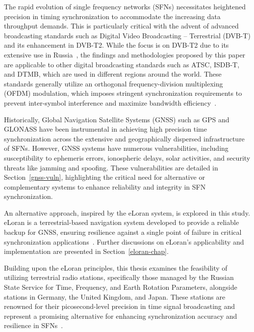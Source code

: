 \documentclass[12pt, a4paper]{extarticle}
\begin{document}

The rapid evolution of single frequency networks (SFNs) necessitates heightened
precision in timing synchronization to accommodate the increasing data
throughput demands. This is particularly critical with the advent of advanced
broadcasting standards such as Digital Video Broadcasting -- Terrestrial
(DVB-T) and its enhancement in DVB-T2. While the focus is on DVB-T2 due to its
extensive use in Russia~\cite{fcp}, the findings and methodologies proposed by
this paper are applicable to other digital broadcasting standards such as ATSC,
ISDB-T, and DTMB, which are used in different regions around the world. These
standards generally utilize an orthogonal frequency-division multiplexing (OFDM)
modulation, which imposes stringent synchronization requirements to prevent
inter-symbol interference and maximize bandwidth
efficiency~\cite{ETSIDVBT22009,liang2007timing,morshed2009synchronization,ofdm}.

Historically, Global Navigation Satellite Systems (GNSS) such as GPS and
GLONASS have been instrumental in achieving high precision time synchronization
across the extensive and geographically dispersed infrastructure of SFNs.
However, GNSS systems have numerous vulnerabilities, including susceptibility
to ephemeris errors, ionospheric delays, solar activities, and security threats
like jamming and spoofing. These vulnerabilities are detailed in
Section~\ref{gnss-vuln}, highlighting the critical need for alternative or
complementary systems to enhance reliability and integrity in SFN
synchronization.

An alternative approach, inspired by the eLoran system, is explored in this
study. eLoran is a terrestrial-based navigation system developed to provide a
reliable backup for GNSS, ensuring resilience against a single point of failure
in critical synchronization applications~\cite{eloran}. Further discussions on
eLoran's applicability and implementation are presented in
Section~\ref{eloran-chap}.

Building upon the eLoran principles, this thesis examines the feasibility of
utilizing terrestrial radio stations, specifically those managed by the Russian
State Service for Time, Frequency, and Earth Rotation Parameters, alongside
stations in Germany, the United Kingdom, and Japan.
These stations are renowned for their picosecond-level precision in time signal
broadcasting and represent a promising alternative for enhancing
synchronization accuracy and resilience in SFNs~\cite{itur1997standard}.
\end{document}
